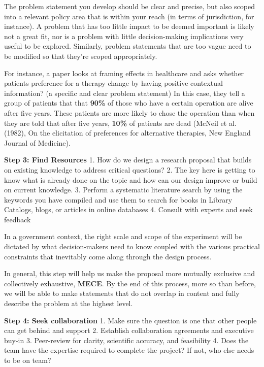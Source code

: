 \documentclass[openany]{book}
\begin{document}
The problem statement you develop should be clear and precise, but also scoped into a relevant policy area that is within your reach (in terms of jurisdiction, for instance). A problem that has too little impact to be deemed important is likely not a great fit, nor is a problem with little decision-making implications very useful to be explored. Similarly, problem statements that are too vague need to be modified so that they're scoped appropriately.

For instance, a paper looks at framing effects in healthcare and asks whether patients preference for a therapy change by having positive contextual information? (a specific and clear problem statement)
In this case, they tell a group of patients that that \textbf{90\%} of those who have a certain operation are alive after five years. These patients are more likely to chose the operation than when they are told that after five years, \textbf{10\%} of patients are dead (McNeil et al. (1982), On the elicitation of preferences for alternative therapies, New England Journal of Medicine).

\textbf{Step 3: Find Resources}
1. How do we design a research proposal that builds on existing knowledge to address critical questions?
2. The key here is getting to know what is already done on the topic and how can our design improve or build on current knowledge.
3. Perform a systematic literature search by using the keywords you have compiled and use them to search for books in Library Catalogs, blogs, or articles in online databases
4. Consult with experts and seek feedback

In a government context, the right scale and scope of the experiment will be dictated by what decision-makers need to know coupled with the various practical constraints that inevitably come along through the design process.

In general, this step will help us make the proposal more mutually exclusive and collectively exhaustive, \textbf{MECE}. By the end of this process, more so than before, we will be able to make statements that do not overlap in content and fully describe the problem at the highest level.

\textbf{Step 4: Seek collaboration}
1. Make sure the question is one that other people can get behind and support
2. Establish collaboration agreements and executive buy-in
3. Peer-review for clarity, scientific accuracy, and feasibility
4. Does the team have the expertise required to complete the project? If not, who else needs to be on team?
\end{document}
